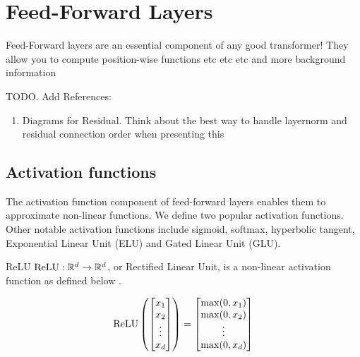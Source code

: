 %
\chapter{Feed-Forward Layers}
%


Feed-Forward layers are an essential component of any good transformer! They allow you to compute position-wise functions etc etc etc and more background information


TODO. Add References:
\begin{enumerate}
    \item Diagrams for Residual. Think about the best way to handle layernorm and residual connection order when presenting this
\end{enumerate}

\section{Activation functions}

The activation function component of feed-forward layers enables them to approximate non-linear functions. We define two popular activation functions. Other notable activation functions include sigmoid, softmax, hyperbolic tangent, Exponential Linear Unit (ELU) and Gated Linear Unit (GLU).

\begin{definition}{ReLU}{}
    $\text{ReLU} : \mathbb{R}^d\to \mathbb{R}^d$, or Rectified Linear Unit, is a non-linear activation function as defined below \cite{Fukushima1975}.

    \[\text{ReLU}\left(\begin{bmatrix}
                x_1    \\
                x_2    \\
                \vdots \\
                x_d    \\
            \end{bmatrix}\right) = \begin{bmatrix}
            \max(0,x_1) \\
            \max(0,x_2) \\
            \vdots      \\
            \max(0,x_d) \\
        \end{bmatrix}\]
\end{definition}

